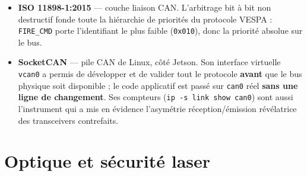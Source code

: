 \documentclass[11pt,a4paper]{article}
\begin{document}
\begin{itemize}[leftmargin=*]
  \item \textbf{ISO 11898-1:2015} \cite{iso11898_1} — couche liaison CAN. L'arbitrage bit à
        bit non destructif fonde toute la hiérarchie de priorités du protocole VESPA :
        \texttt{FIRE\_CMD} porte l'identifiant le plus faible (\texttt{0x010}), donc la
        priorité absolue sur le bus.

  \item \textbf{SocketCAN} \cite{socketcan} — pile CAN de Linux, côté Jetson. Son interface
        virtuelle \texttt{vcan0} a permis de développer et de valider tout le protocole
        \textbf{avant} que le bus physique soit disponible ; le code applicatif est passé sur
        \texttt{can0} réel \textbf{sans une ligne de changement}. Ses compteurs
        (\texttt{ip -s link show can0}) sont aussi l'instrument qui a mis en évidence
        l'asymétrie réception/émission révélatrice des transceivers contrefaits.
\end{itemize}

\section{Optique et sécurité laser}
\end{document}
